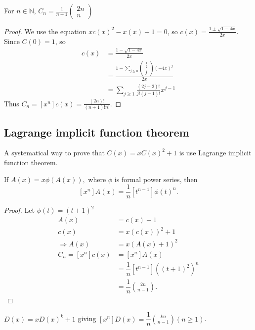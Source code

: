 \begin{theorem}
For $n\in \mathbb{N}$, $C_n=\frac{1}{n+1}\begin{pmatrix}
2n\\n
\end{pmatrix}$
\end{theorem}
\begin{proof}
We use the equation $xc(x)^2-x(x)+1=0$, so $c(x)=\frac{1\pm\sqrt{1-4x}}{2x}$. Since $C(0)=1$, so 
\begin{align*}
c(x)&=\frac{1-\sqrt{1-4x}}{2x}\\
&=\frac{1-\sum_{j\geq 0}\begin{pmatrix}
\frac{1}{2}\\j
\end{pmatrix}(-4x)^j}{2x}\\
&=\sum_{j\geq 1}\frac{(2j-2)!}{j!(j-1)!}x^{j-1}
\end{align*}
Thus $C_n=[x^n]c(x)=\frac{(2n)!}{(n+1)!n!}$.
\end{proof}

\subsection{Lagrange implicit function theorem}
A systematical way to prove that $C(x) = x C(x)^2 +1$ is use Lagrange implicit function theorem.   

\begin{theorem}
If $A(x)=x\phi(A(x)),$ where $\phi$ is formal power series, then
$$[x^n]A(x)=\dfrac{1}{n}[t^{n-1}]\phi(t)^n.$$
\end{theorem}

\begin{proof}
Let $\phi(t) = (t+1)^2$
\begin{align*}
A(x) &= c(x)-1\\
c(x) &=x(c(x))^2+1\\
\Rightarrow A(x)&=x(A(x)+1)^2\\
C_n=[x^n]c(x)&=[x^n]A(x)\\
&=\dfrac{1}{n}[t^{n-1}]((t+1)^2)^n\\
&=\dfrac{1}{n}{\binom{2n}{n-1}}.
\end{align*}
\end{proof}

\begin{remark}
$D(x)=xD(x)^k+1$ giving $[x^n]D(x)=\dfrac{1}{n}{\binom{kn}{n-1}}(n\geq 1)$.
\end{remark}

